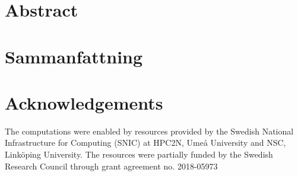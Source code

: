 \chapter*{Abstract}
\lipsum[1]
\chapter*{Sammanfattning}
\lipsum[1]
\chapter*{Acknowledgements}
The computations were enabled by resources provided by the Swedish
National Infrastructure for Computing (SNIC) at HPC2N, Umeå University
and NSC, Linköping University. The resources were partially funded by the Swedish Research 
Council through grant agreement no. 2018-05973